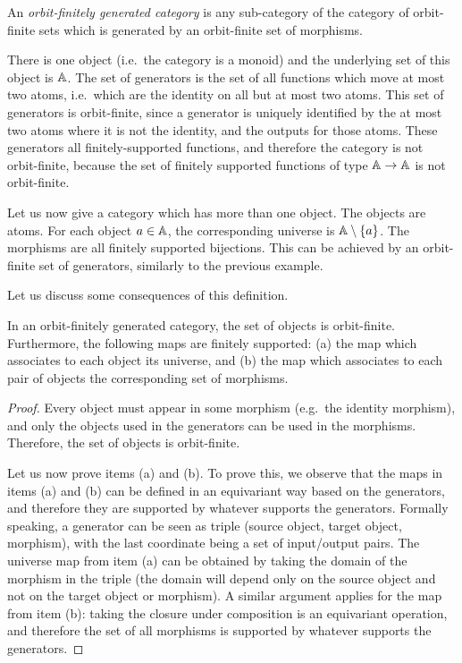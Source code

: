 \begin{definition}
    \label{def:orbit-finitely-generated-category}
    An \emph{orbit-finitely generated category} is any sub-category of the category of orbit-finite sets which is generated by an orbit-finite set of morphisms.
\end{definition}



\begin{myexample}[A monoid]
There is one object (i.e.~the category is a monoid) and the underlying set of this object is $\mathbb A$. The set of generators is the set of all functions which move at most two atoms, i.e.~which are the identity on all but at most two atoms. This set of generators is orbit-finite, since a generator is uniquely identified by the at most two atoms where it is not the identity, and the outputs for those atoms. These generators  all finitely-supported functions, and therefore the category is not orbit-finite, because the set of finitely supported functions of type $\mathbb A \to \mathbb A$ is not orbit-finite. 
\end{myexample}

\begin{myexample} Let us now give a category which has more than one object.
The objects are atoms. For each object $a \in \mathbb A$, the corresponding universe is $\mathbb A \setminus \{a\}$. The morphisms are all finitely supported bijections. This can be achieved by an orbit-finite set of generators, similarly to the previous example.
\end{myexample}

Let us discuss some consequences of this definition. 

\begin{lemma}
    In an orbit-finitely generated category, the set of objects is orbit-finite. Furthermore, the following maps are finitely supported: (a) the map which associates to each object its universe, and (b) the map which associates to each pair of objects the corresponding set of morphisms.
\end{lemma}
\begin{proof}
    Every object must appear in some morphism (e.g.~the identity morphism), and only the objects used in the generators can be used in the morphisms. Therefore, the set of objects is orbit-finite. 

    Let us now prove items (a) and (b). To prove this, we observe that the maps in items (a) and (b) can be defined in an equivariant way based on the generators, and therefore they are supported by whatever supports the generators.  Formally speaking, a generator can be seen as triple (source object, target object, morphism), with the last coordinate being a set of input/output pairs. The universe map from item (a) can be obtained by taking the domain of the morphism in the triple (the domain will depend only on the source object and not on the target object or morphism). A similar argument applies for the map from item (b):  taking the closure under composition is an equivariant operation, and therefore the set of all morphisms is supported by whatever supports the generators. 
\end{proof}

